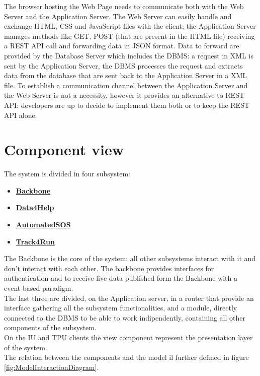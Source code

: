 The browser hosting the Web Page needs to communicate both with the Web Server and the Application Server. 
The Web Server can easily handle and exchange HTML, CSS and JavaScript files with the client; the Application Server manages methods like GET, POST  (that are present in the HTML file) receiving a REST API call and forwarding data in JSON format. Data to forward are provided by the Database Server which includes the DBMS: a request in XML is sent by the Application Server, the DBMS processes the request and extracts data from the database that are sent back to the Application Server in a XML file. To establish a communication channel between the Application Server and the Web Server is not a necessity, however it provides an alternative to REST API: developers are up to decide to implement them both or to keep the REST API alone. 

\section{Component view}
The system is divided in four subsystem:
\begin{itemize}
\item \textbf{\href{subsect:backboneComponentView}{Backbone}}
\item \textbf{\href{subsect:D4HComponentView}{Data4Help}}
\item \textbf{\href{subsect:ASOSComponentView}{AutomatedSOS}}
\item \textbf{\href{subsect:T4RComponentView}{Track4Run}}
\end{itemize}
The Backbone is the core of the system: all other subsystems interact with it and don't interact with each other. The backbone provides interfaces for authentication and to receive live data published form the Backbone with a event-based paradigm.\\
The last three are divided, on the Application server, in a router that provide an interface gathering all the subsystem functionalities, and a module, directly connected to the DBMS to be able to work indipendently, containing all other components of the subsystem. \\
On the IU and TPU clients the view component represent the presentation layer of the system.\\
The relation between the components and the model il further defined in figure \ref{fig:ModelInteractionDiagram}.
